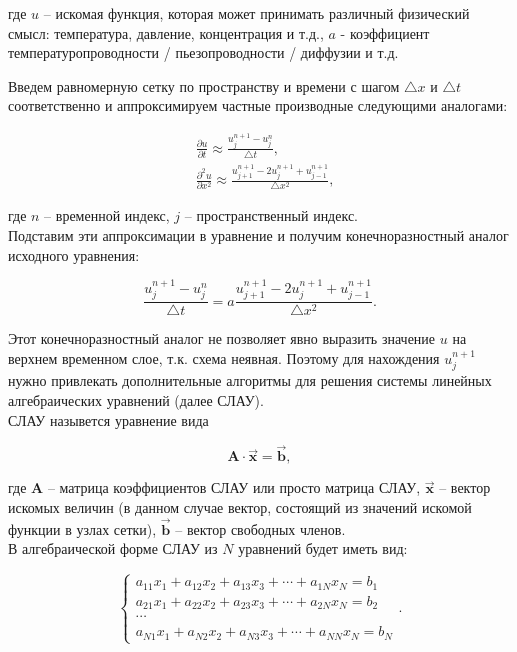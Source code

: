 \documentclass[12pt,a4paper]{article}
\begin{document}
		где $u$ -- искомая функция, которая может принимать различный физический смысл: температура, давление, концентрация и т.д., $a$ - коэффициент температуропроводности / пьезопроводности / диффузии и т.д.

		Введем равномерную сетку по пространству и времени с шагом $\triangle x$ и $\triangle t$ соответственно и аппроксимируем частные производные следующими аналогами:

		\begin{equation}
			\begin{split}
				& \frac{\partial u}{\partial t} \approx \frac{u^{n+1}_{j} - u^{n}_{j}}{\triangle t}, \\
				& \frac{\partial^{2} u}{\partial x^{2}} \approx \frac{u^{n+1}_{j+1} - 2 u^{n+1}_{j} + u^{n+1}_{j-1}}{\triangle x^{2}},
			\end{split}
		\end{equation}

		где $n$ -- временной индекс, $j$ -- пространственный индекс.\\

		Подставим эти аппроксимации в уравнение и получим конечноразностный аналог исходного уравнения:

		\begin{equation}
			\frac{u^{n+1}_{j} - u^{n}_{j}}{\triangle t} = a \frac{u^{n+1}_{j+1} - 2 u^{n+1}_{j} + u^{n+1}_{j-1}}{\triangle x^{2}}.
		\end{equation}

		Этот конечноразностный аналог не позволяет явно выразить значение $u$ на верхнем временном слое, т.к. схема неявная. Поэтому для нахождения $u^{n+1}_{j}$ нужно привлекать дополнительные алгоритмы для решения системы линейных алгебраических уравнений (далее СЛАУ).\\
		СЛАУ назывется уравнение вида
		
		\begin{equation}
			\mathbf{A} \cdot \vec{\mathbf{x}} = \vec{\mathbf{b}},
		\end{equation}

		где $\mathbf{A}$ -- матрица коэффициентов СЛАУ или просто матрица СЛАУ, $\vec{\mathbf{x}}$ -- вектор искомых величин (в данном случае вектор, состоящий из значений искомой функции в узлах сетки), $\vec{\mathbf{b}}$ -- вектор свободных членов.\\

		В алгебраической форме СЛАУ из $N$ уравнений будет иметь вид:

		\begin{equation}
			\begin{cases}
				a_{11} x_{1} + a_{12} x_{2} + a_{13} x_{3} + \cdots + a_{1N} x_{N} = b_{1} \\
				a_{21} x_{1} + a_{22} x_{2} + a_{23} x_{3} + \cdots + a_{2N} x_{N} = b_{2} \\
				\cdots \\
				a_{N1} x_{1} + a_{N2} x_{2} + a_{N3} x_{3} + \cdots + a_{NN} x_{N} = b_{N}
			\end{cases}.
		\end{equation}
\end{document}
